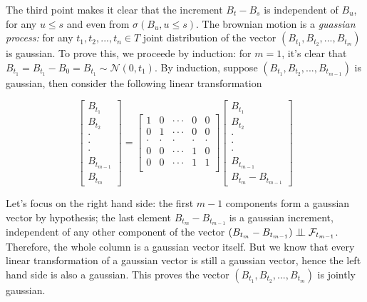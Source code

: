 The third point makes it clear that the increment $B_t - B_s$ is independent of $B_u$, for any $u \leq s$ and even from $\sigma(B_u, u\leq s)$. The brownian motion is a \textit{guassian process:} for any $t_1,t_2,...,t_n \in T$ joint distribution of the vector $(B_{t_1},B_{t_2},...,B_{t_m})$ is gaussian. To prove this, we proceede by induction: for $m = 1$, it's clear that $B_{t_1} = B_{t_1}-B_0 = B_{t_1} \sim \mathcal{N}(0,t_1)$. By induction, suppose $(B_{t_1},B_{t_2},...,B_{t_{m-1}})$ is gaussian, then consider the following linear transformation

\begin{equation*}
    \begin{bmatrix}
        B_{t_1} \\
        B_{t_2} \\
        \cdot \\
        \cdot \\
        \cdot \\
        B_{t_{m-1}} \\
        B_{t_m}
    \end{bmatrix}
    = 
    \begin{bmatrix}
        1 & 0 &\cdot\cdot\cdot & 0 & 0\\
        0 & 1 & \cdot\cdot\cdot & 0 & 0\\
        \cdot & \cdot & \cdot & \cdot & \cdot\\
        0 & 0 & \cdot\cdot\cdot & 1 & 0 \\
        0 & 0 & \cdot\cdot\cdot & 1 & 1 \\
    \end{bmatrix}   
    \begin{bmatrix}
        B_{t_1} \\
        B_{t_2} \\
        \cdot \\
        \cdot \\
        \cdot \\
        B_{t_{m-1}} \\
        B_{t_{m}}-B_{t_{m-1}}
    \end{bmatrix}
\end{equation*}

Let's focus on the right hand side: the first $m-1$ components form a gaussian vector by hypothesis; the last element $B_{t_m}-B_{t_{m-1}}$ is a gaussian increment, independent of any other component of the vector $(B_{t_{m}} - B_{t_{m-1}}) \perp \!\!\! \perp \mathcal{F}_{t_{m-1}}$. Therefore, the whole column is a gaussian vector itself. But we know that every linear transformation of a gaussian vector is still a gaussian vector, hence the left hand side is also a gaussian. This proves the vector $(B_{t_1},B_{t_2},...,B_{t_m})$ is jointly gaussian.

